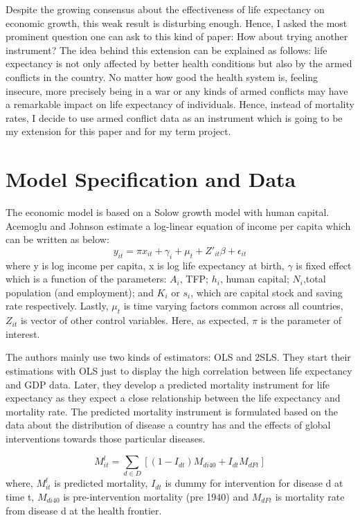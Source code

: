 \documentclass[11pt]{article}
\begin{document}
Despite the growing consensus about the effectiveness of life expectancy on economic growth, this weak result is disturbing enough. Hence, I asked the most prominent question one can ask to this kind of paper: How about trying another instrument? The idea behind this extension can be explained as follows: life expectancy is not only affected by better health conditions but also by the armed conflicts in the country. No matter how good the health system is, feeling insecure, more precisely being in a war or any kinds of armed conflicts may have a remarkable impact on life expectancy of individuals. Hence, instead of mortality rates, I decide to use armed conflict data as an instrument which is going to be my extension for this paper and for my term project.
\section*{Model Specification and Data}
The economic model is based on a Solow growth model with human capital. Acemoglu and Johnson estimate a log-linear equation of income per capita which can be written as below:
\begin{equation}
y_{it}=\pi x_{it}+ \gamma_{i} + \mu_{t} + Z'_{it}\beta + \epsilon_{it}
\end{equation}
where y is log income per capita, x is log life expectancy at birth, $\gamma$ is fixed effect which is a function of the parameters: $A_{i}$, TFP; $h_{i}$, human capital; $N_{i}$,total population (and employment); and $K_{i}$ or $s_{i}$, which are capital stock and saving rate respectively. Lastly, $\mu_{t}$ is time varying factors common across all countries, $Z_{it}$ is vector of other control variables. Here, as expected, $\pi$ is the parameter of interest. 

The authors mainly use two kinds of estimators: OLS and 2SLS. They start their estimations with OLS just to display the high correlation between life expectancy and GDP data. Later, they develop a predicted mortality instrument for life expectancy as they expect a close relationship between the life expectancy and mortality rate. The predicted mortality instrument is formulated based on the data about the distribution of disease a country has and the effects of global interventions towards those particular diseases.

\begin{equation}
M^{l}_{it} = \sum\limits_{d \in D} [(1-I_{dt})M_{di40}+I_{dt}M_{dFt}]
\end{equation}
where, $M^{l}_{it}$ is predicted mortality, $I_{dt}$ is dummy for intervention for disease d at time t, $M_{di40}$ is pre-intervention mortality (pre 1940) and $M_{dFt}$ is mortality rate from disease d at the health frontier.
\end{document}
